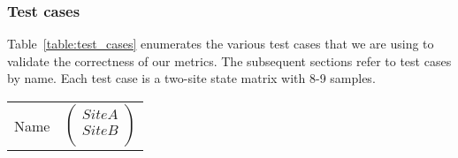\documentclass[12pt]{article}
\begin{document}
\subsubsection{Test cases}
Table~\ref{table:test_cases} enumerates the various test cases that we are using
to validate the correctness of our metrics. The subsequent sections refer to
test cases by name. Each test case is a two-site state matrix with 8-9 samples.

\begin{table}[H]
  \centering
  \begin{tabular}{lc} Name & $\left(\begin{array}{cc} Site A \\ Site B
                                     \\ \end{array}\right)$ \\


\end{tabular}
\end{table}
\end{document}
